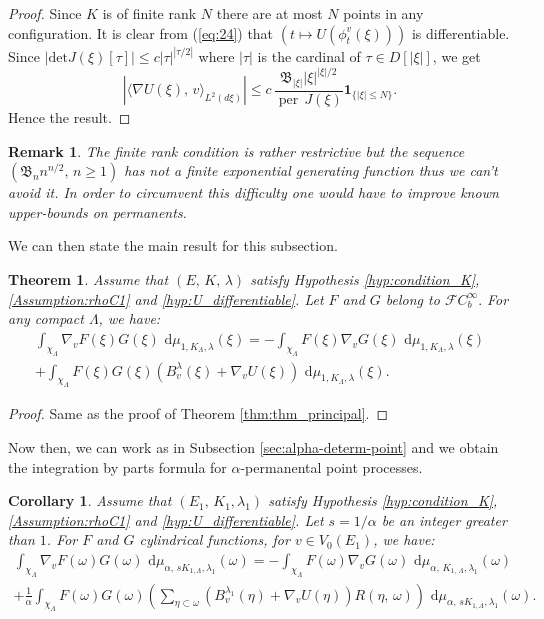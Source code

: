 \documentclass[11pt,a4paper]{amsart}
\newtheorem{Theorem}{Theorem}
\newtheorem{Remark}{Remark}
\newtheorem{Corollary}{Corollary}
\begin{document}
\begin{proof}
  Since $K$ is of finite rank $N$ there are at most $N$ points in any
  configuration.  It is clear from (\ref{eq:24}) that $(t\mapsto
  U(\phi_t^v(\xi)))$ is differentiable.  Since $|{{\text{det}}} J(\xi)[\tau]|\le
  c|\tau|^{|\tau/2|}$ where $|\tau|$ is the cardinal of $\tau\in
  D[|\xi|]$, we get
  \begin{equation*}
    \left|\langle \nabla U(\xi),\, v\rangle_{L^2(d\xi)}\right|\le c \,
    \frac{{{\mathfrak B}}_{|\xi|} |\xi|^{|\xi|/2}}{{\operatorname{per}} \, J(\xi)}{{\mathbf 1}}_{\{|\xi|\le N\}}.
  \end{equation*}
  Hence the result.
\end{proof}
\begin{Remark}
  The finite rank condition is rather restrictive but the sequence
  $({{\mathfrak B}}_n n^{n/2},\, n\ge 1)$ has not a finite exponential generating
  function thus we can't avoid it. In order to circumvent this
  difficulty one would have to improve known upper-bounds on
  permanents.
\end{Remark}
We can then state the main result for this subsection.
\begin{Theorem}
  \label{thm:ipp_permanental}
  Assume that $(E,\, K, \, \lambda)$ satisfy Hypothesis
  \ref{hyp:condition_K}, \ref{Assumption:rhoC1} and
  \ref{hyp:U_differentiable}.  Let $F$ and $G$ belong to ${{\mathcal{F}C^{\infty}_b}}.$ For
  any compact $\Lambda$, we have:
  \begin{multline*}
    \int_{\chi_\Lambda} \nabla_v F(\xi) G(\xi){\text{ d}}\mu_{1,K_\Lambda,\lambda}(\xi) =-\int_{\chi_\Lambda} F(\xi)\nabla_v G(\xi){\text{ d}}\mu_{1,K_\Lambda,\lambda}(\xi)\\
    +\int_{\chi_\Lambda} F(\xi)G(\xi)\left(B_v^\lambda
      (\xi)+\nabla_vU(\xi)\right){\text{ d}}\mu_{1,K_\Lambda,\lambda}(\xi).
  \end{multline*}
\end{Theorem}
\begin{proof}
  Same as the proof of Theorem \ref{thm:thm_principal}.
\end{proof}
Now then, we can work as in Subsection \ref{sec:alpha-determ-point}
and we obtain the integration by parts formula for
$\alpha$-permanental point processes.
\begin{Corollary}
  Assume that $(E_1,\, K_1, \lambda_1)$ satisfy Hypothesis
  \ref{hyp:condition_K}, \ref{Assumption:rhoC1} and
  \ref{hyp:U_differentiable}. Let $s=1/\alpha$ be an integer greater
  than $1$. For $F$ and $G$ cylindrical functions, for $v\in
  V_0(E_1)$, we have:
  \begin{multline*}
    \int_{\chi_\Lambda} \nabla_{v} F(\omega) G(\omega){\text{ d}}\mu_{\alpha,\,
      sK_{1,\Lambda},\lambda_1}(\omega) =-\int_{\chi_\Lambda}
    F(\omega)\nabla_{v} G(\omega){\text{ d}}\mu_{\alpha,\, K_{1,\,\Lambda},\lambda_1}(\omega)\\
    +\frac 1\alpha\int_{\chi_\Lambda}
    F(\omega)G(\omega)\left(\sum_{\eta\subset\omega}
      (B^{\lambda_1}_v(\eta)+\nabla_vU(\eta))R(\eta,\, \omega)
    \right){\text{ d}}\mu_{\alpha,\,sK_{1,\Lambda},\lambda_1}(\omega).
  \end{multline*}
\end{Corollary}
\end{document}
